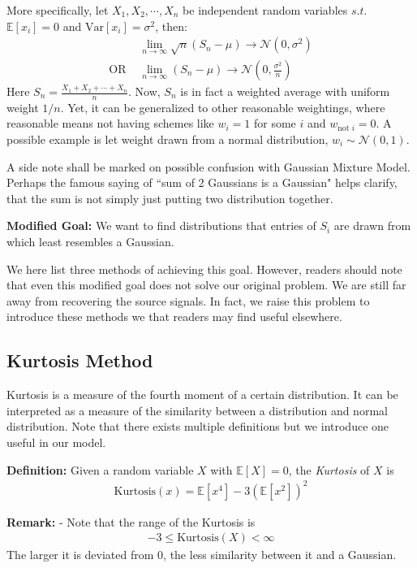More specifically, let $X_1, X_2, \cdots , X_n$ be independent random variables $s.t.$ $\mathbb{E}[x_i]=0$ and $\text{Var}[x_i] = \sigma ^2 $, then:
\begin{align*}
    & \lim_{n \to \infty} \sqrt{n}(S_n - \mu)  \to \mathcal{N}(0,\sigma ^2) \\
    \text{OR } & \lim_{n \to \infty} (S_n - \mu)  \to \mathcal{N}(0,\frac{\sigma ^2}{n})
\end{align*}
Here $S_n = \displaystyle \frac{X_1+ X_2 + \cdots + X_n}{n}$. Now, $S_n$ is in fact a weighted average with uniform weight $1/n$. Yet, it can be generalized to other reasonable weightings, where reasonable means not having schemes like $w_i = 1$ for some $i$ and $w_{\text{not }i} = 0$. A possible example is let weight drawn from a normal distribution, $w_i \sim \mathcal{N}(0,1)$.

A side note shall be marked on possible confusion with Gaussian Mixture Model. Perhaps the famous saying of ``sum of 2 Gaussians is a Gaussian" helps clarify, that the sum is not simply just putting two distribution together.

\textbf{Modified Goal: } \newline
We want to find distributions that entries of $S_i$ are drawn from which least resembles a Gaussian. 

We here list three methods of achieving this goal. However, readers should note that even this modified goal does not solve our original problem. We are still far away from recovering the source signals. In fact, we raise this problem to introduce these methods we that readers may find useful elsewhere.


\subsection{Kurtosis Method}
Kurtosis is a measure of the fourth moment of a certain distribution. It can be interpreted as a measure of the similarity between a distribution and normal distribution. Note that there exists multiple definitions but we introduce one useful in our model.

\textbf{Definition: } Given a random variable $X$ with $\mathbb{E}[X] = 0$, the \textit{Kurtosis} of $X$ is
\begin{align*}
    \text{Kurtosis}(x) = \mathbb{E}[x^4] - 3(\mathbb{E}[x^2])^2
\end{align*}

\textbf{Remark: } \newline
- Note that the range of the Kurtosis is\begin{align*}
     -3 \leq \text{Kurtosis}(X) < \infty
\end{align*}
The larger it is deviated from 0, the less similarity between it and a Gaussian.


